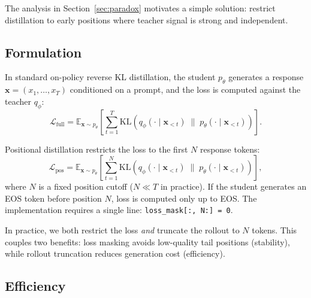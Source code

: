 \documentclass[10pt]{article}
\newcommand{\Method}{Positional distillation}
\newcommand{\KL}{\mathrm{KL}}
\begin{document}
The analysis in Section~\ref{sec:paradox} motivates a simple solution: restrict distillation to early positions where teacher signal is strong and independent.

\subsection{Formulation}

In standard on-policy reverse KL distillation, the student $p_\theta$ generates a response $\mathbf{x} = (x_1, \ldots, x_T)$ conditioned on a prompt, and the loss is computed against the teacher $q_\phi$:
\begin{equation}
\mathcal{L}_{\text{full}} = \mathbb{E}_{\mathbf{x} \sim p_\theta} \left[ \sum_{t=1}^{T} \KL\!\left(q_\phi(\cdot \mid \mathbf{x}_{<t}) \;\|\; p_\theta(\cdot \mid \mathbf{x}_{<t})\right) \right].
\label{eq:full_loss}
\end{equation}

\Method{} restricts the loss to the first $N$ response tokens:
\begin{equation}
\mathcal{L}_{\text{pos}} = \mathbb{E}_{\mathbf{x} \sim p_\theta} \left[ \sum_{t=1}^{N} \KL\!\left(q_\phi(\cdot \mid \mathbf{x}_{<t}) \;\|\; p_\theta(\cdot \mid \mathbf{x}_{<t})\right) \right],
\label{eq:pos_loss}
\end{equation}
where $N$ is a fixed position cutoff ($N \ll T$ in practice). If the student generates an EOS token before position $N$, loss is computed only up to EOS. The implementation requires a single line: \texttt{loss\_mask[:, N:] = 0}.

In practice, we both restrict the loss \emph{and} truncate the rollout to $N$ tokens. This couples two benefits: loss masking avoids low-quality tail positions (stability), while rollout truncation reduces generation cost (efficiency).

\subsection{Efficiency}
\end{document}
